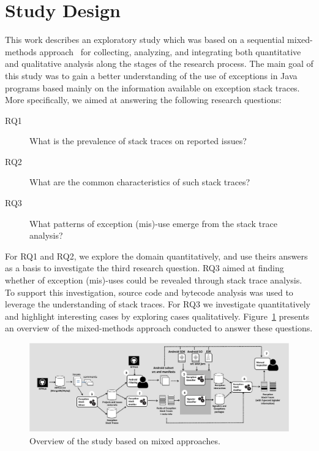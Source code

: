 \documentclass[conference]{IEEEtran}
\begin{document}
\section{Study Design}

This work describes an exploratory study which was based on a sequential mixed-methods approach~\cite{ivankova2006using} for collecting, analyzing, and integrating both quantitative and qualitative analysis along the stages of the research process. The main goal of this study was to gain a better understanding of the use of exceptions in Java programs based mainly on the information available on exception stack traces. More specifically, we aimed at answering the following research questions:

\begin{description}
    \item[RQ1] What is the prevalence of stack traces on  reported issues?
    \item[RQ2] What are the common characteristics of such stack traces?
    \item[RQ3] What patterns of exception (mis)-use emerge from the stack trace analysis?
\end{description}

For RQ1 and RQ2, we explore the domain quantitatively, and use theirs answers as a basis to investigate the third research question. RQ3 aimed at finding whether of exception (mis)-uses could be revealed through stack trace analysis. To support this investigation, source code and bytecode analysis was used to leverage the  understanding of stack traces. For RQ3 we investigate quantitatively and highlight interesting cases by exploring cases qualitatively. Figure~\ref{fig:overviewfig} presents an overview of the mixed-methods approach conducted to answer these questions. 

\begin{figure}
\centering
\includegraphics[width=\hsize]{overview.pdf}
\caption{Overview of the study based on mixed approaches.}
\label{fig:overviewfig}
\end{figure}
\end{document}
